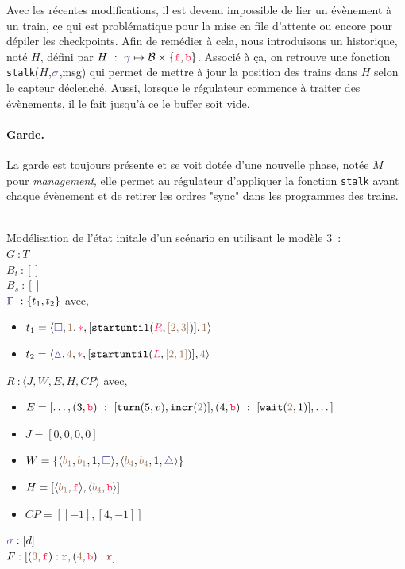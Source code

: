 \documentclass[oneside, a4paper, 11pt]{book}
\newcommand{\trainFmt}[1]{{\color{traincolor} #1}}
\newcommand{\trainTupleMF}[5]{\langle \trainFmt{#1}, \posFmt{#2}, \dirFmt{#3}, #4, \posFmt{#5} \rangle}
\newcommand{\forward}{\ensuremath{\mathtt{f}}}
\newcommand{\backward}{\ensuremath{\mathtt{b}}}
\newcommand{\dirFmt}[1]{{\color{dircolor} #1}}
\newcommand{\dirForward}{\ensuremath{\dirFmt{\forward}}}
\newcommand{\dirBackward}{\ensuremath{\dirFmt{\backward}}}
\newcommand{\posFmt}[1]{{\color{poscolor}{#1}}}
\newcommand{\bid}[1]{\ensuremath{\posFmt{b_{#1}}}}
\newcommand{\su}[2]{{\mbox{$\mathtt{startuntil}(\dirFmt{#1}, \posFmt{#2})$}}}
\newcommand{\incr}[1]{{\mbox{\ensuremath{\mathtt{incr}(\posFmt{#1})}}}}
\newcommand{\turnOrder}[2]{{\mbox{\ensuremath{\mathtt{turn}(#1, #2)}}}}
\newcommand{\wait}[2]{{\mbox{\ensuremath{\mathtt{wait}(\posFmt{#1}, #2)}}}}
\newcommand{\swFmt}[1]{{\color{swcolor}{#1}}}
\newcommand{\sigred}{{\mbox{${\color{red!50!black}\mathtt{r}}$}}}
\newcommand{\commentaire}[1]{{\color{commentcolor}{#1}}}
\begin{document}
Avec les récentes modifications, il est devenu impossible de lier un évènement à un train, ce qui est problématique pour la mise en file d'attente ou encore pour dépiler les checkpoints. Afin de remédier à cela, nous introduisons un historique, noté $H$, défini par $H~:~\trainFmt{\gamma} \mapsto \mathcal{B} \times \{\dirForward, \dirBackward\} $. Associé à ça, on retrouve une fonction \texttt{stalk}($H$,$\swFmt{\sigma}$,msg) qui permet de mettre à jour la position des trains dans $H$ selon le capteur déclenché.
Aussi, lorsque le régulateur commence à traiter des évènements, il le fait jusqu'à ce le buffer soit vide.


\paragraph{Garde.} La garde est toujours présente et se voit dotée d'une nouvelle phase, notée $M$ pour \textit{management}, elle permet au régulateur d'appliquer la fonction \texttt{stalk} avant chaque évènement et de retirer les ordres "sync" dans les programmes des trains.

\newpage
\begin{example}[GoodEnding M3]
		~\\
	Modélisation de l'état initale d'un scénario en utilisant le modèle 3~:
	\\$G~: T$
	\vspace{0.3cm}
	\\$B_t~: []$ \commentaire{// vide}
	\vspace{0.3cm}
	\\$B_s~: []$ \commentaire{// vide}
	\vspace{0.3cm}
	\\$\trainFmt{\Gamma}~: \{t_1, t_2\}$ avec,
	\begin{itemize}
		\item[] $t_1 = \trainTupleMF{\square}{1}{*}{[\su{R}{[2,3]}]}{1}$
		\item[] $t_2 = \trainTupleMF{\vartriangle}{4}{*}{[\su{L}{[2,1]}]}{4}$
	\end{itemize}
	\vspace{0.3cm}
	$R~: \langle J,W,E,H,CP \rangle$ avec,	
	\begin{itemize}
		\item[] $E = [\dots,(3,\dirBackward)~:~[\turnOrder{5}{v}, \incr{2}], (4,\dirBackward)~:~[\wait{2}{1}],\dots]$
		\item[] $J = [0,0,0,0]$
		\item[] $W = \{\langle \bid{1}, \bid{1}, 1, \trainFmt{\square} \rangle, \langle \bid{4}, \bid{4}, 1, \trainFmt{\triangle} \rangle\}$
		\item[] $H = [\langle \bid{1}, \dirForward \rangle, \langle \bid{4}, \dirBackward \rangle]$
		\item[] $CP = [[-1],[4,-1]]$
	\end{itemize}
	\vspace{0.3cm}
	$\swFmt{\sigma} : [d]$
	\vspace{0.3cm}
	\\$F : [(\posFmt{3},\dirForward) : \sigred,(\posFmt{4},\dirBackward) : \sigred]$ \commentaire{// De base, tous les feux sont au vert}
\end{example}
\end{document}
